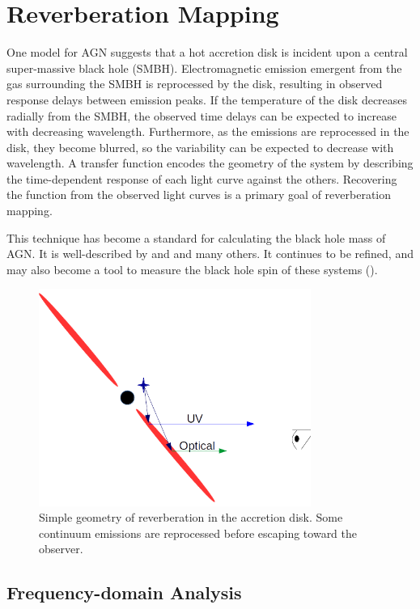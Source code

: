 \documentclass[11pt,letterpaper]{article}
\begin{document}
\section{Reverberation Mapping}
	One model for AGN suggests that a hot accretion disk is incident upon a central super-massive black hole (SMBH). Electromagnetic emission emergent from the gas surrounding the SMBH is reprocessed by the disk, resulting in observed response delays between emission peaks. If the temperature of the disk decreases radially from the SMBH, the observed time delays can be expected to increase with decreasing wavelength. Furthermore, as the emissions are reprocessed in the disk, they become blurred, so the variability can be expected to decrease with wavelength. A transfer function encodes the geometry of the system by describing the time-dependent response of each light curve against the others. Recovering the function from the observed light curves is a primary goal of reverberation mapping.

	This technique has become a standard for calculating the black hole mass of AGN. It is well-described by \cite{2007MNRAS.380..669C} and \cite{2014A&ARv..22...72U} and many others. It continues to be refined, and may also become a tool to measure the black hole spin of these systems (\cite{2016arXiv160606736K}).

	\begin{figure}
		\centering
		\includegraphics[width=3.5in]{../img/basic_geometry.png}
		\caption{Simple geometry of reverberation in the accretion disk. Some continuum emissions are reprocessed before escaping toward the observer.}
	\end{figure}

\subsection{Frequency-domain Analysis}
\end{document}
